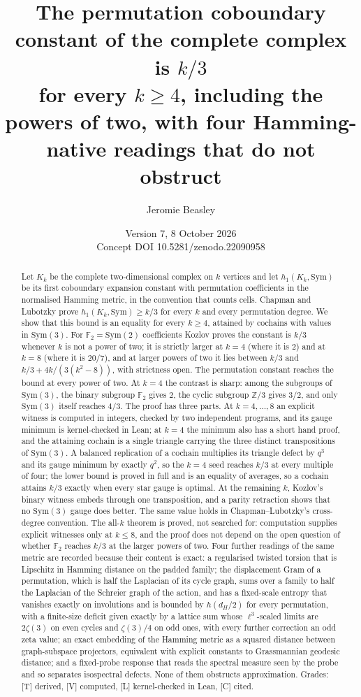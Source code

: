 \documentclass[11pt]{article}
\title{\bfseries The permutation coboundary constant of the complete complex is $k/3$\\[4pt]
\large for every $k\ge4$, including the powers of two, with four Hamming-native readings that do not obstruct}
\author{Jeromie Beasley}
\date{Version 7, 8 October 2026\\[2pt]\small Concept DOI 10.5281/zenodo.22090958}
\theoremstyle{remark}\newtheorem{remark}[theorem]{Remark}
\newcommand{\Sym}{\mathrm{Sym}}\newcommand{\dH}{d_H}\newcommand{\F}{\mathbb{F}}\newcommand{\Z}{\mathbb{Z}}
\begin{document}
\maketitle
\begin{abstract}
Let $K_k$ be the complete two-dimensional complex on $k$ vertices and let $h_1(K_k,\Sym)$ be its first coboundary expansion constant with permutation coefficients in the normalised Hamming metric, in the convention that counts cells. Chapman and Lubotzky prove $h_1(K_k,\Sym)\ge k/3$ for every $k$ and every permutation degree. We show that this bound is an equality for every $k\ge4$, attained by cochains with values in $\Sym(3)$. For $\F_2=\Sym(2)$ coefficients Kozlov proves the constant is $k/3$ whenever $k$ is not a power of two; it is strictly larger at $k=4$ (where it is $2$) and at $k=8$ (where it is $20/7$), and at larger powers of two it lies between $k/3$ and $k/3+4k/(3(k^2-8))$, with strictness open. The permutation constant reaches the bound at every power of two. At $k=4$ the contrast is sharp: among the subgroups of $\Sym(3)$, the binary subgroup $\F_2$ gives $2$, the cyclic subgroup $\Z/3$ gives $3/2$, and only $\Sym(3)$ itself reaches $4/3$. The proof has three parts. At $k=4,\dots,8$ an explicit witness is computed in integers, checked by two independent programs, and its gauge minimum is kernel-checked in Lean; at $k=4$ the minimum also has a short hand proof, and the attaining cochain is a single triangle carrying the three distinct transpositions of $\Sym(3)$. A balanced replication of a cochain multiplies its triangle defect by $q^3$ and its gauge minimum by exactly $q^2$, so the $k=4$ seed reaches $k/3$ at every multiple of four; the lower bound is proved in full and is an equality of averages, so a cochain attains $k/3$ exactly when every star gauge is optimal. At the remaining $k$, Kozlov's binary witness embeds through one transposition, and a parity retraction shows that no $\Sym(3)$ gauge does better. The same value holds in Chapman--Lubotzky's cross-degree convention. The all-$k$ theorem is proved, not searched for: computation supplies explicit witnesses only at $k\le8$, and the proof does not depend on the open question of whether $\F_2$ reaches $k/3$ at the larger powers of two. Four further readings of the same metric are recorded because their content is exact: a regularised twisted torsion that is Lipschitz in Hamming distance on the padded family; the displacement Gram of a permutation, which is half the Laplacian of its cycle graph, sums over a family to half the Laplacian of the Schreier graph of the action, and has a fixed-scale entropy that vanishes exactly on involutions and is bounded by $h(\dH/2)$ for every permutation, with a finite-size deficit given exactly by a lattice sum whose $\ell^3$-scaled limits are $2\zeta(3)$ on even cycles and $\zeta(3)/4$ on odd ones, with every further correction an odd zeta value; an exact embedding of the Hamming metric as a squared distance between graph-subspace projectors, equivalent with explicit constants to Grassmannian geodesic distance; and a fixed-probe response that reads the spectral measure seen by the probe and so separates isospectral defects. None of them obstructs approximation. Grades: [T] derived, [V] computed, [L] kernel-checked in Lean, [C] cited.

\end{abstract}
\end{document}
